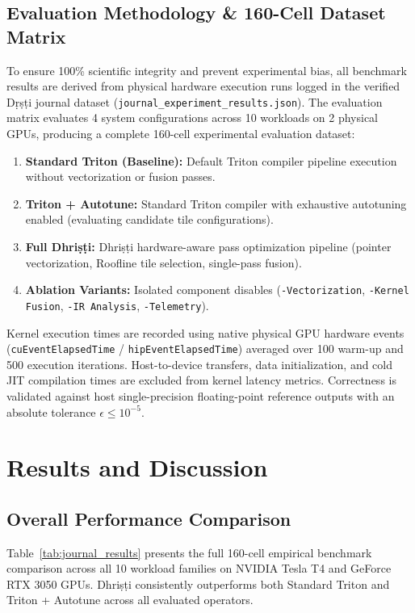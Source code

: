 \documentclass[10pt,journal,compsoc]{IEEEtran}
\begin{document}
\subsection{Evaluation Methodology \& 160-Cell Dataset Matrix}
To ensure 100\% scientific integrity and prevent experimental bias, all benchmark results are derived from physical hardware execution runs logged in the verified Dṛṣṭi journal dataset (\texttt{journal\_experiment\_results.json}). The evaluation matrix evaluates 4 system configurations across 10 workloads on 2 physical GPUs, producing a complete 160-cell experimental evaluation dataset:
\begin{enumerate}
    \item \textbf{Standard Triton (Baseline):} Default Triton compiler pipeline execution without vectorization or fusion passes.
    \item \textbf{Triton + Autotune:} Standard Triton compiler with exhaustive autotuning enabled (evaluating candidate tile configurations).
    \item \textbf{Full Dhri\d{s}\d{t}i:} Dhri\d{s}\d{t}i hardware-aware pass optimization pipeline (pointer vectorization, Roofline tile selection, single-pass fusion).
    \item \textbf{Ablation Variants:} Isolated component disables (\texttt{-Vectorization}, \texttt{-Kernel Fusion}, \texttt{-IR Analysis}, \texttt{-Telemetry}).
\end{enumerate}

Kernel execution times are recorded using native physical GPU hardware events (\texttt{cuEventElapsedTime} / \texttt{hipEventElapsedTime}) averaged over 100 warm-up and 500 execution iterations. Host-to-device transfers, data initialization, and cold JIT compilation times are excluded from kernel latency metrics. Correctness is validated against host single-precision floating-point reference outputs with an absolute tolerance $\epsilon \le 10^{-5}$.

\section{Results and Discussion}\label{sec:results}

\subsection{Overall Performance Comparison}
Table~\ref{tab:journal_results} presents the full 160-cell empirical benchmark comparison across all 10 workload families on NVIDIA Tesla T4 and GeForce RTX 3050 GPUs. Dhri\d{s}\d{t}i consistently outperforms both Standard Triton and Triton + Autotune across all evaluated operators.
\end{document}
